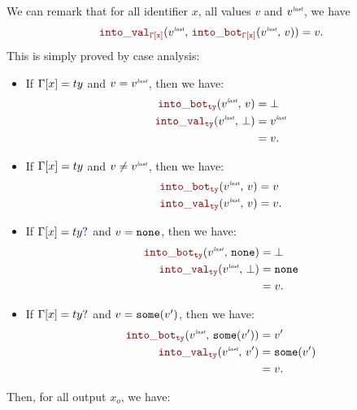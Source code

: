 \begin{skippableproof}
    We can remark that for all identifier $x$, all values $v$ and $v^{\textit{\tiny last}}$, we have
    \begin{equation*}
        \intoVal{\tyCtx[x]}{v^\explast}{\intoBot{\tyCtx[x]}{v^\explast}{v}} = v.
    \end{equation*}
    This is simply proved by case analysis:
    \begin{itemize}
        \item If $\Gamma[x] = ty$ and $v = v^{\textit{\tiny last}}$, then we have:
              \begin{align*}
                  \intoBot{ty}{v^\explast}{v}    & = \bot       \\
                  \intoVal{ty}{v^\explast}{\bot} & = v^\explast \\
                                                 & = v.
              \end{align*}
        \item If $\Gamma[x] = ty$ and $v \neq v^{\textit{\tiny last}}$, then we have:
              \begin{align*}
                  \intoBot{ty}{v^\explast}{v} & = v  \\
                  \intoVal{ty}{v^\explast}{v} & = v.
              \end{align*}
        \item If $\tyCtx[x] = \mayB{ty}$ and $v = \mathtt{{none}}$, then we have:
              \begin{align*}
                  \intoBot{ty}{v^\explast}{\none} & = \bot  \\
                  \intoVal{ty}{v^\explast}{\bot}  & = \none \\
                                                  & = v.
              \end{align*}
        \item If $\tyCtx[x] = \mayB{ty}$ and $v = \mathtt{{some}}(v')$, then we have:
              \begin{align*}
                  \intoBot{ty}{v^\explast}{\some{v'}} & = v'        \\
                  \intoVal{ty}{v^\explast}{v'}        & = \some{v'} \\
                                                      & = v.
              \end{align*}
    \end{itemize}
    Then, for all output $x_o$, we have:
    \begin{equation*}
        \begin{array}{ll}

\end{array}
\end{equation*}
\end{skippableproof}

